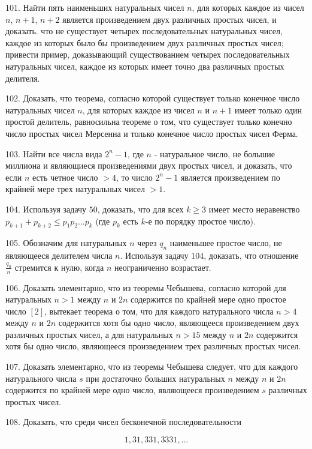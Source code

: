 \documentclass[12pt, a4paper, openany]{book}
\begin{document}
101. Найти пять наименьших натуральных чисел $n$, для которых каждое из чисел $n$, $n+1$, $n+2$ является произведением двух различных простых чисел, и доказать. что не существует четырех последовательных натуральных чисел, каждое из которых было бы произведением двух различных простых чисел; привести пример, доказывающий существованием четырех последовательных натуральных чисел, каждое из которых имеет точно два различных простых делителя.

102. Доказать, что теорема, согласно которой существует только конечное число натуральных чисел $n$, для которых каждое из чисел $n$ и $n+1$ имеет только один простой делитель, равносильна теореме о том, что существует только конечно число простых чисел Мерсенна и только конечное число простых чисел Ферма.

103. Найти все числа вида $2^n - 1$, где $n$ - натуральное число, не большие миллиона и являющиеся произведениями двух простых чисел, и доказать, что если $n$ есть четное число $>4$, то число $2^n-1$ является произведением по крайней мере трех натуральных чисел $>1$.

104. Используя задачу $50$, доказать, что для всех $k \geqslant 3$ имеет место неравенство $p_{k+1} + p_{k+2}\leqslant p_1 p_2 \ldots p_k$ (где $p_k$ есть $k$-е по порядку простое число).

105. Обозначим для натуральных $n$ через $q_n$ наименьшее простое число, не являющееся делителем числа $n$. Используя задачу $104$, доказать, что отношение $\displaystyle \frac{q_n}{n}$ стремится к нулю, когда $n$ неограниченно возрастает.

106. Доказать элементарно, что из теоремы Чебышева, согласно которой для натуральных $n>1$ между $n$ и $2n$ содержится по крайней мере одно простое число $[2]$, вытекает теорема о том, что для каждого натурального числа $n>4$ между $n$ и $2n$ содержится хотя бы одно число, являющееся произведением двух различных простых чисел, а для натуральных $n>15$ между $n$ и $2n$ содержится хотя бы одно число, являющееся произведением трех различных простых чисел.

107. Доказать элементарно, что из теоремы Чебышева следует, что для каждого натурального числа $s$ при достаточно больших натуральных $n$ между $n$ и $2n$ содержится по крайней мере одно число, являющееся произведением $s$ различных простых чисел.

108. Доказать, что среди чисел бесконечной последовательности

$$ 1, 31, 331, 3331, \dots $$
\end{document}
